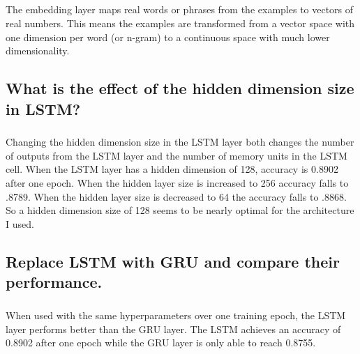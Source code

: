 \documentclass[11pt]{article}
\begin{document}
\subparagraph{}

The embedding layer maps real words or phrases from the examples to vectors of real numbers. This means the examples are transformed from a vector space with one dimension per word (or n-gram) to a continuous space with much lower dimensionality.

\subsection{What is the effect of the hidden dimension size in LSTM?}

\subparagraph{}

Changing the hidden dimension size in the LSTM layer both changes the number of outputs from the LSTM layer and the number of memory units in the LSTM cell. When the LSTM layer has a hidden dimension of 128, accuracy is 0.8902 after one epoch. When the hidden layer size is increased to 256 accuracy falls to .8789. When the hidden layer size is decreased to 64 the accuracy falls to .8868. So a hidden dimension size of 128 seems to be nearly optimal for the architecture I used.

\subsection{Replace LSTM with GRU and compare their performance.}

\subparagraph{}

When used with the same hyperparameters over one training epoch, the LSTM layer performs better than the GRU layer. The LSTM achieves an accuracy of 0.8902 after one epoch while the GRU layer is only able to reach 0.8755. 
\end{document}
